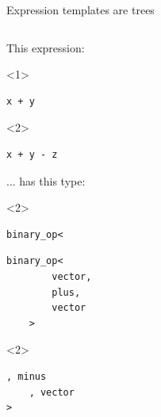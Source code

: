 \documentclass[@BEAMER_OPTIONS@]{beamer}
\begin{document}
\begin{frame}[fragile]{Expression templates are trees}
    \begin{columns}
        \begin{column}{0.45\textwidth}
            \begin{exampleblock}{This expression:}
                \begin{onlyenv}<1>
                    \begin{lstlisting}[numbers=none]
x + y
                    \end{lstlisting}
                \end{onlyenv}
                \begin{onlyenv}<2>
                    \begin{lstlisting}[numbers=none]
x + y - z
                    \end{lstlisting}
                \end{onlyenv}
            \end{exampleblock}
            \begin{exampleblock}{... has this type:}
                \begin{uncoverenv}<2>
                    \begin{lstlisting}[numbers=none]
binary_op<
                    \end{lstlisting}
                \end{uncoverenv}
                \begin{lstlisting}[numbers=none]
    binary_op<
        vector,
        plus,
        vector
    >
                \end{lstlisting}
                \begin{uncoverenv}<2>
                    \begin{lstlisting}[numbers=none]
    , minus
    , vector
>
                    \end{lstlisting}
                \end{uncoverenv}
            \end{exampleblock}
        \end{column}
        \begin{column}{0.45\textwidth}
            \begin{figure}
\end{figure}
\end{column}
\end{columns}
\end{frame}
\end{document}
